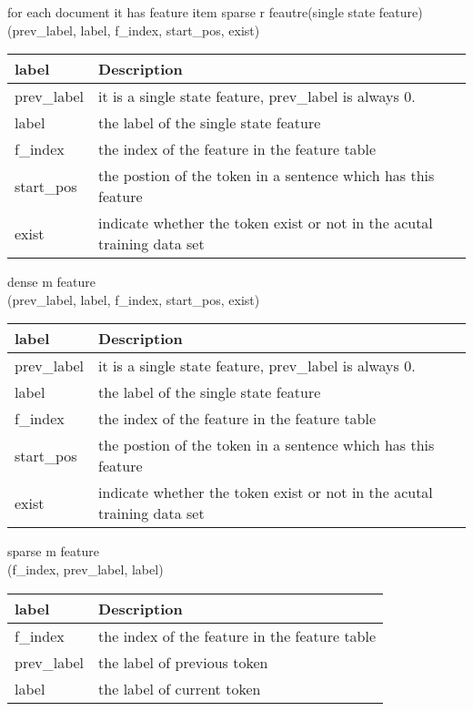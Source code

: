 for each document it has feature item
sparse r feautre(single state feature) \\
(prev\_label, label, f\_index, start\_pos, exist)

\begin{center}
    \begin{tabular}{ | l | l |}
    \hline
    label & Description \\ \hline
    prev\_label & it is a single state feature, prev\_label is always 0.\\ 
    label       & the label of the single state feature\\
    f\_index    & the index of the feature in the feature table\\
    start\_pos  & the postion of the token in a sentence which has this feature\\
    exist       & indicate whether the token exist or not in the acutal training data set\\
    \hline
    \end{tabular}
\end{center}

dense m feature\\
(prev\_label, label, f\_index, start\_pos, exist)
\begin{center}
    \begin{tabular}{ | l | l |}
    \hline
    label & Description \\ \hline
    prev\_label & it is a single state feature, prev\_label is always 0.\\ 
    label       & the label of the single state feature\\
    f\_index    &  the index of the feature in the feature table\\
    start\_pos  & the postion of the token in a sentence which has this feature\\
    exist       & indicate whether the token exist or not in the acutal training data set\\
    \hline
    \end{tabular}
\end{center}

sparse m feature\\
(f\_index, prev\_label, label)
\begin{center}
    \begin{tabular}{ | l | l |}
    \hline
    label & Description \\ \hline
    f\_index    &  the index of the feature in the feature table\\
    prev\_label &  the label of previous token \\
    label       &  the label of current token\\
    \hline
    \end{tabular}
\end{center}

